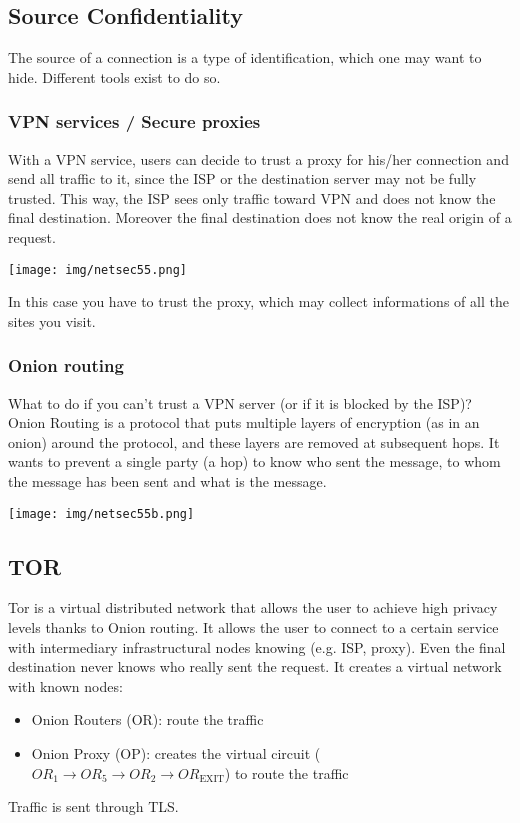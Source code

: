 \documentclass[a4paper, 10pt, titlepage]{article}
\begin{document}
\subsection{Source Confidentiality}
The source of a connection is a type of identification, which one may want to hide. Different tools exist to do so.

\subsubsection*{VPN services / Secure proxies}
With a VPN service, users can decide to trust a proxy for his/her connection and send all traffic to it, since the ISP or the destination server may not be fully trusted. This way, the ISP sees only traffic toward VPN and does not know the final destination. Moreover the final destination does not know the real origin of a request.
\begin{center}
	\texttt{[image: img/netsec55.png]}
\end{center}
In this case you have to trust the proxy, which may collect informations of all the sites you visit.

\subsubsection*{Onion routing}
What to do if you can’t trust a VPN server (or if it is blocked by the ISP)? Onion Routing is a protocol that puts multiple layers of encryption (as in an onion) around the protocol, and these layers are removed at subsequent hops. It wants to prevent a single party (a hop) to know who sent the message, to whom the message has been sent and what is the message.
\begin{center}
	\texttt{[image: img/netsec55b.png]}
\end{center}

\subsection*{TOR}
Tor is a virtual distributed network that allows the user to achieve high privacy levels thanks to Onion routing. It allows the user to connect to a certain service with intermediary infrastructural nodes knowing (e.g. ISP, proxy). Even the final destination never knows who really sent the request. It creates a virtual network with known nodes:
\begin{itemize}
	\item Onion Routers (OR): route the traffic
	\item Onion Proxy (OP): creates the virtual circuit ($OR_1 \rightarrow OR_5 \rightarrow OR_2 \rightarrow OR_{\text{EXIT}}$) to route the traffic	
\end{itemize}
Traffic is sent through TLS.
\end{document}
